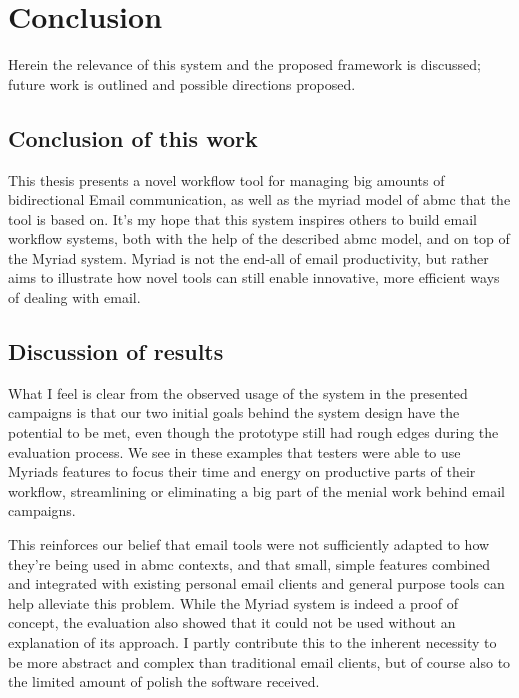 \chapter{Conclusion}
\label{chapter:Conclusion}

Herein the relevance of this system and the proposed framework is discussed; future work is outlined and possible directions proposed.

\section{Conclusion of this work}

This thesis presents a novel workflow tool for managing big amounts of bidirectional Email communication, as well as the myriad model of \gls{abmc} that the tool is based on.
It’s my hope that this system inspires others to build email workflow systems, both with the help of the described \gls{abmc} model, and on top of the Myriad system. Myriad is not the end-all of email productivity, but rather aims to illustrate how novel tools can still enable innovative, more efficient ways of dealing with email.

\section{Discussion of results}

What I feel is clear from the observed usage of the system in the presented campaigns is that our two initial goals behind the system design have the potential to be met, even though the prototype still had rough edges during the evaluation process. We see in these examples that testers were able to use Myriads features to focus their time and energy on productive parts of their workflow, streamlining or eliminating a big part of the menial work behind email campaigns.

This reinforces our belief that email tools were not sufficiently adapted to how they’re being used in \gls{abmc} contexts, and that small, simple features combined and integrated with existing personal email clients and general purpose tools can help alleviate this problem.
While the Myriad system is indeed a proof of concept, the evaluation also showed that it could not be used without an explanation of its approach. I partly contribute this to the inherent necessity to be more abstract and complex than traditional email clients, but of course also to the limited amount of polish the software received.

